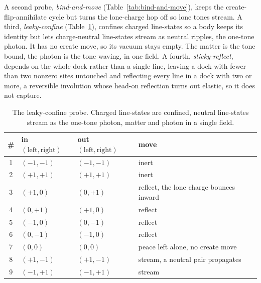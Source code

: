 A second probe, \emph{bind-and-move} (Table~\ref{tab:bind-and-move}), keeps the create-flip-annihilate cycle but turns the lone-charge hop off so lone tones stream. A third, \emph{leaky-confine} (Table~\ref{tab:leaky-confine}), confines charged line-states so a body keeps its identity but lets charge-neutral line-states stream as neutral ripples, the one-tone photon. It has no create move, so its vacuum stays empty. The matter is the tone bound, the photon is the tone waving, in one field. A fourth, \emph{sticky-reflect}, depends on the whole dock rather than a single line, leaving a dock with fewer than two nonzero sites untouched and reflecting every line in a dock with two or more, a reversible involution whose head-on reflection turns out elastic, so it does not capture.

\begin{table}[ht]
\centering
\begin{tabular}{@{}cll l@{}}
\toprule
\# & in $(\mathrm{left}, \mathrm{right})$ & out $(\mathrm{left}, \mathrm{right})$ & move \\
\midrule
1 & $(-1, -1)$ & $(-1, -1)$ & inert \\
2 & $(+1, +1)$ & $(+1, +1)$ & inert \\
3 & $(+1, 0)$ & $(0, +1)$ & reflect, the lone charge bounces inward \\
4 & $(0, +1)$ & $(+1, 0)$ & reflect \\
5 & $(-1, 0)$ & $(0, -1)$ & reflect \\
6 & $(0, -1)$ & $(-1, 0)$ & reflect \\
7 & $(0, 0)$ & $(0, 0)$ & peace left alone, no create move \\
8 & $(+1, -1)$ & $(+1, -1)$ & stream, a neutral pair propagates \\
9 & $(-1, +1)$ & $(-1, +1)$ & stream \\
\bottomrule
\end{tabular}
\caption{The leaky-confine probe. Charged line-states are confined, neutral line-states stream as the one-tone photon, matter and photon in a single field.}
\label{tab:leaky-confine}
\end{table}

